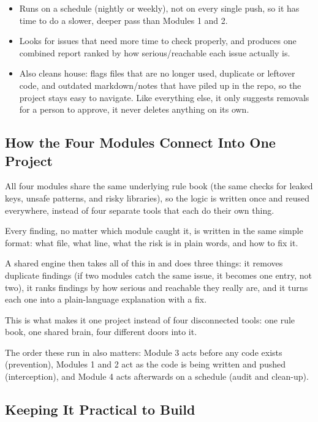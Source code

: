 \documentclass[12pt,a4paper]{article}
\begin{document}
\begin{itemize}
    \item Runs on a schedule (nightly or weekly), not on every single push, so it has time to do a slower, deeper pass than Modules 1 and 2.

    \item Looks for issues that need more time to check properly, and produces one combined report ranked by how serious/reachable each issue actually is.

    \item Also cleans house: flags files that are no longer used, duplicate or leftover code, and outdated markdown/notes that have piled up in the repo, so the project stays easy to navigate. Like everything else, it only suggests removals for a person to approve, it never deletes anything on its own.
\end{itemize}

\subsection{How the Four Modules Connect Into One Project}

All four modules share the same underlying rule book (the same checks for leaked keys, unsafe patterns, and risky libraries), so the logic is written once and reused everywhere, instead of four separate tools that each do their own thing.

Every finding, no matter which module caught it, is written in the same simple format: what file, what line, what the risk is in plain words, and how to fix it.

A shared engine then takes all of this in and does three things: it removes duplicate findings (if two modules catch the same issue, it becomes one entry, not two), it ranks findings by how serious and reachable they really are, and it turns each one into a plain-language explanation with a fix.

This is what makes it one project instead of four disconnected tools: one rule book, one shared brain, four different doors into it.

The order these run in also matters: Module 3 acts before any code exists (prevention), Modules 1 and 2 act as the code is being written and pushed (interception), and Module 4 acts afterwards on a schedule (audit and clean-up).

\subsection{Keeping It Practical to Build}
\end{document}
